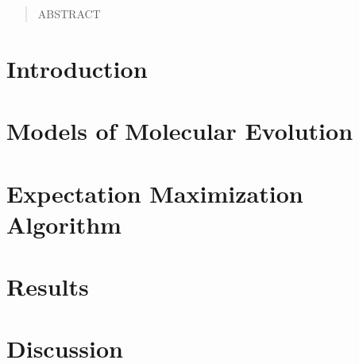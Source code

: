 \documentclass[12pt,twoside]{article}
\begin{document}
\begin{abstract}
ABSTRACT
\end{abstract}

\section{Introduction}

\section{Models of Molecular Evolution}

\section{Expectation Maximization Algorithm}

\section{Results}

\section{Discussion}
\end{document}
